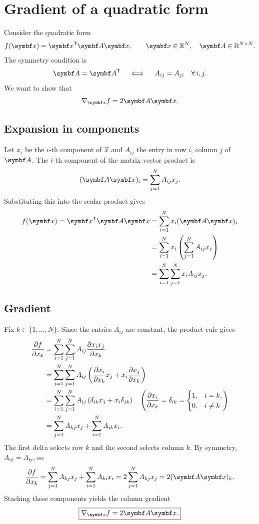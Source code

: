 \section{Gradient of a quadratic form}

Consider the quadratic form
\[
  f(\vec{x}) = \vec{x}^{\T}\mat{A}\vec{x},
  \qquad \vec{x}\in\R^{N},\quad
  \mat{A}\in\R^{N\times N}.
\]
The symmetry condition is
\[
  \mat{A} = \mat{A}^{\T}
  \quad\iff\quad
  A_{ij} = A_{ji} \quad \forall\, i,j.
\]
We want to show that
\[
  \nabla_{\vec{x}} f = 2\mat{A}\vec{x}.
\]

\subsection{Expansion in components}

Let \(x_i\) be the \(i\)-th component of \(\vec{x}\) and \(A_{ij}\)
the entry in row \(i\), column \(j\) of \(\mat{A}\). The \(i\)-th
component of the matrix-vector product is
\[
  (\mat{A}\vec{x})_i = \sum_{j=1}^{N} A_{ij}x_j.
\]
Substituting this into the scalar product gives
\begin{align*}
  f(\vec{x}) = \vec{x}^{\T}\mat{A}\vec{x}
  &= \sum_{i=1}^{N} x_i(\mat{A}\vec{x})_i \\
  &= \sum_{i=1}^{N} x_i \left(\sum_{j=1}^{N} A_{ij}x_j\right) \\
  &= \sum_{i=1}^{N}\sum_{j=1}^{N} x_i A_{ij}x_j.
\end{align*}

\subsection{Gradient}

Fix \(k \in \{1,\ldots,N\}\). Since the entries \(A_{ij}\) are constant,
the product rule gives
\begin{align*}
  \pd[f]{x_k}
  &= \sum_{i=1}^{N}\sum_{j=1}^{N}
       A_{ij}\pd[x_i x_j]{x_k} \\
  &= \sum_{i=1}^{N}\sum_{j=1}^{N} A_{ij}
       \left(\pd[x_i]{x_k}x_j
             + x_i\pd[x_j]{x_k}\right) \\
  &= \sum_{i=1}^{N}\sum_{j=1}^{N} A_{ij}
       \left(\delta_{ik}x_j+x_i\delta_{jk}\right)
       \quad
       \left(\pd[x_i]{x_k}
       = \delta_{ik}
       = \begin{cases}
           1, & i=k,\\
           0, & i\ne k
         \end{cases}\right) \\
  &= \sum_{j=1}^{N} A_{kj}x_j + \sum_{i=1}^{N} A_{ik}x_i.
\end{align*}
The first delta selects row \(k\) and the second
selects column \(k\). By symmetry, \(A_{ik}=A_{ki}\), so
\[
  \pd[f]{x_k}
  = \sum_{j=1}^{N} A_{kj}x_j + \sum_{i=1}^{N} A_{ki}x_i
  = 2\sum_{j=1}^{N} A_{kj}x_j
  = 2(\mat{A}\vec{x})_k.
\]
Stacking these components yields the column gradient
\[
  \boxed{\nabla_{\vec{x}} f = 2\mat{A}\vec{x}.}
\]
